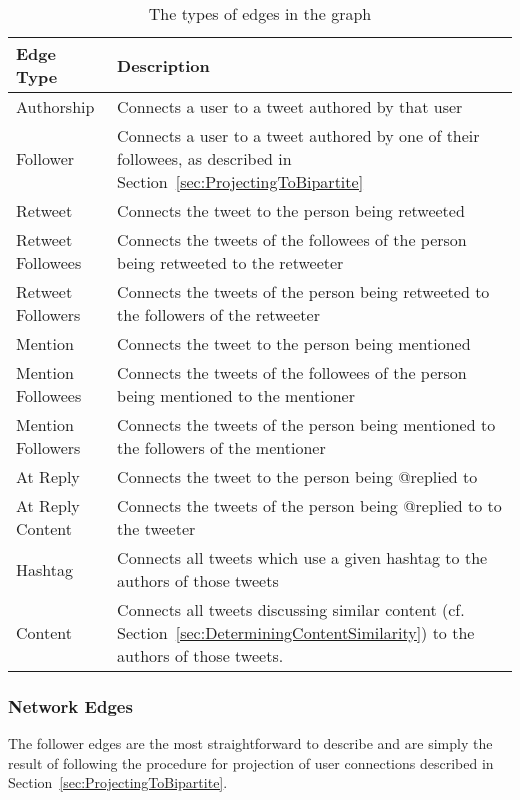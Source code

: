 \begin{table}
\centering
\begin{tabular}{p{1.9cm}|p{10cm}}
{\bf Edge Type} & {\bf Description} \\ \hline
Authorship & Connects a user to a tweet authored by that user \\ \hline
Follower & Connects a user to a tweet authored by one of their followees, as described in Section~\ref{sec:ProjectingToBipartite} \\ \hline
Retweet & Connects the tweet to the person being retweeted \\ \hline
Retweet Followees & Connects the tweets of the followees of the person being retweeted to the retweeter \\ \hline
Retweet Followers & Connects the tweets of the person being retweeted to the followers of the retweeter \\ \hline
Mention & Connects the tweet to the person being mentioned \\ \hline
Mention Followees & Connects the tweets of the followees of the person being mentioned to the mentioner \\ \hline
Mention Followers & Connects the tweets of the person being mentioned to the followers of the mentioner \\ \hline
At Reply & Connects the tweet to the person being @replied to \\ \hline
At Reply Content & Connects the tweets of the person being @replied to to the tweeter \\ \hline
Hashtag & Connects all tweets which use a given hashtag to the authors of those tweets \\ \hline
Content & Connects all tweets discussing similar content (cf. Section~\ref{sec:DeterminingContentSimilarity}) to the authors of those tweets. \\
\end{tabular}
\caption{The types of edges in the graph}
\label{tab:EdgeTypes}
\end{table}


\subsubsection{Network Edges}

The follower edges are the most straightforward to describe and are simply the result of following the procedure for projection of user connections described in Section~\ref{sec:ProjectingToBipartite}.

